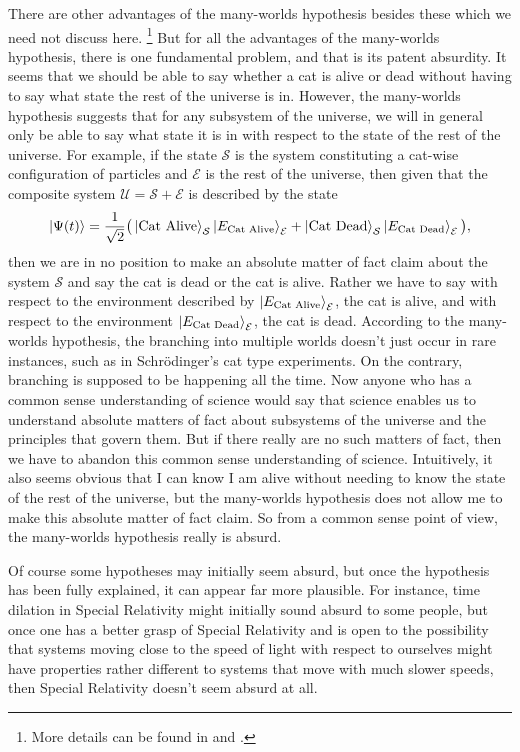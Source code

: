 \documentclass[letter, 12pt]{turabian-thesis}
\theoremstyle{hypothesis}
\let\origfootnote\footnote %
\renewcommand{\footnote}[1]{%
\noindent %
\origfootnote{#1}}
\begin{document}
There are other advantages  of the many-worlds hypothesis besides these which we need not discuss here.\footnote{More details can be found in \cite{Schlosshauer} and \cite{joos2013decoherence}.} But for all the advantages of the many-worlds hypothesis, there is one fundamental problem, and that is its patent absurdity. It seems that we should be able to say whether a cat is alive or dead without having to say what state the rest of the universe is in. However, the many-worlds hypothesis suggests that for any subsystem of the universe, we will in general only be able to say what state it is in with respect to the state of the rest of the universe. For example, if the state $\mathcal{S}$ is the system constituting a cat-wise configuration of particles and $\mathcal{E}$ is the rest of the universe, then given that the composite system $\mathcal{U}=\mathcal{S}+\mathcal{E}$ is described by the state $$\ket{\Psi(t)}=\frac{1}{\sqrt{2}}\big(\ket{\text{Cat Alive}}_\mathcal{S}\ket{E_\text{Cat Alive}}_\mathcal{E}+\ket{\text{Cat Dead}}_\mathcal{S}\ket{E_\text{Cat Dead}}_\mathcal{E}\big),$$ then we are in no position to make an absolute matter of fact claim about the system $\mathcal{S}$ and say the cat is dead or the cat is alive. Rather we have to say with respect to the environment described by $\ket{E_\text{Cat Alive}}_\mathcal{E}$, the cat is alive, and with respect to the environment $\ket{E_\text{Cat Dead}}_\mathcal{E}$, the cat is dead. According to the many-worlds hypothesis, the branching into multiple worlds doesn't just occur in rare instances, such as in Schr\"{o}dinger's cat type experiments. On the contrary, branching is supposed to be happening all the time.  Now anyone who has a common sense understanding of science would say that science enables us to understand absolute matters of fact about subsystems of the universe and the principles that govern them. But if there really are no such matters of fact, then we have to abandon this common sense understanding of science. Intuitively, it also seems obvious that I can know I am alive without needing to know the state of the rest of the universe, but the many-worlds hypothesis does not allow me to make this absolute matter of fact claim. So from a common sense point of view, the many-worlds hypothesis really is absurd.

 Of course some hypotheses may initially seem absurd, but once the hypothesis has been fully explained, it can appear far more plausible. For instance, time dilation in Special Relativity might initially sound absurd to some people, but once one has a better grasp of Special Relativity and is open to the possibility that  systems moving close to the speed of light with respect to ourselves might have properties rather different to systems that move with much slower speeds, then Special Relativity doesn't seem absurd at all.  
 
\end{document}
